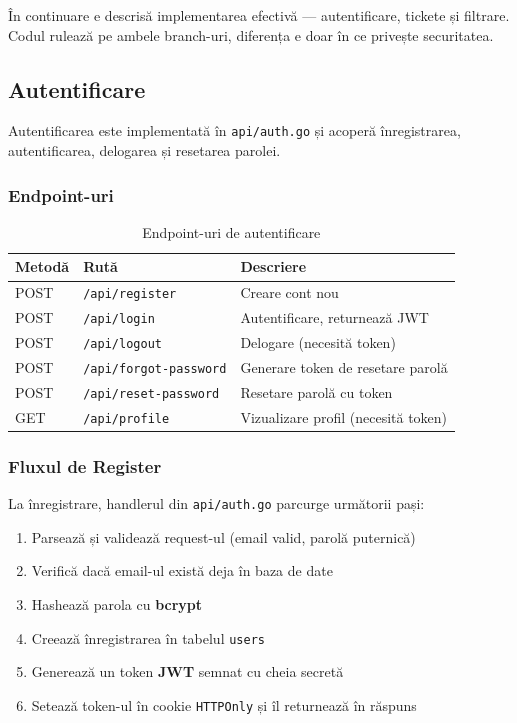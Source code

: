 \documentclass[12pt]{article}
\begin{document}
În continuare e descrisă implementarea efectivă --- autentificare, tickete și filtrare.
Codul rulează pe ambele branch-uri, diferența e doar în ce privește securitatea.

\subsection{Autentificare}

Autentificarea este implementată în \texttt{api/auth.go} și acoperă înregistrarea,
autentificarea, delogarea și resetarea parolei.

\subsubsection*{Endpoint-uri}

\begin{table}[H]
\centering
\begin{tabular}{|l|l|l|}
\hline
\textbf{Metodă} & \textbf{Rută} & \textbf{Descriere} \\
\hline
POST & \texttt{/api/register}        & Creare cont nou \\
POST & \texttt{/api/login}           & Autentificare, returnează JWT \\
POST & \texttt{/api/logout}          & Delogare (necesită token) \\
POST & \texttt{/api/forgot-password} & Generare token de resetare parolă \\
POST & \texttt{/api/reset-password}  & Resetare parolă cu token \\
GET  & \texttt{/api/profile}         & Vizualizare profil (necesită token) \\
\hline
\end{tabular}
\caption{Endpoint-uri de autentificare}
\end{table}

\subsubsection*{Fluxul de Register}

La înregistrare, handlerul din \texttt{api/auth.go} parcurge următorii pași:

\begin{enumerate}
    \item Parsează și validează request-ul (email valid, parolă puternică)
    \item Verifică dacă email-ul există deja în baza de date
    \item Hashează parola cu \textbf{bcrypt}
    \item Creează înregistrarea în tabelul \texttt{users}
    \item Generează un token \textbf{JWT} semnat cu cheia secretă
    \item Setează token-ul în cookie \texttt{HTTPOnly} și îl returnează în răspuns
\end{enumerate}
\end{document}
